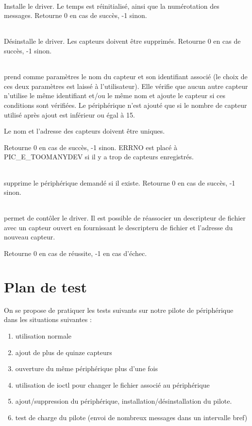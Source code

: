 \begin{m_desc}

 \item [PIC\_DrvInstall] \hfill\\
Installe le driver.
Le temps est réinitialisé, ainsi que la numérotation des messages.
Retourne 0 en cas de succès, -1 sinon.

 \item [PIC\_DrvRemove] \hfill\\
Désinstalle le driver.
Les capteurs doivent être supprimés.
Retourne 0 en cas de succès, -1 sinon.

 \item [PIC\_DevAdd] \hfill\\
 prend comme paramètres le nom du capteur et son identifiant associé (le choix de 
ces deux paramètres est laissé à l'utilisateur). Elle vérifie que aucun autre 
capteur n'utilise le même identifiant et/ou le même nom et ajoute le capteur
 si ces conditions sont vérifiées.
Le périphérique n'est ajouté que si le nombre de capteur utilisé après ajout
 est inférieur ou égal à 15.

Le nom et l'adresse des capteurs doivent être uniques.

Retourne 0 en cas de succès, -1 sinon.
ERRNO est placé à PIC\_E\_TOOMANYDEV si il y a trop de capteurs enregistrés.

 \item [PIC\_DevDelete] \hfill\\
supprime le périphérique demandé si il existe. 
Retourne 0 en cas de succès, -1 sinon.


\item [PIC\_ioctl]\hfill\\
permet de contôler le driver.
Il est possible de réassocier un descripteur de fichier avec un capteur ouvert
en fournissant le descripteru de fichier et l'adresse du nouveau capteur.

Retourne 0 en cas de réussite, -1 en cas d'échec.
\end{m_desc}


\section{Plan de test}

On se propose de pratiquer les tests suivants sur notre pilote de périphérique dans les situations suivantes :

\begin{enumerate}
 \item utilisation normale
 \item ajout de plus de quinze capteurs
 \item ouverture du même périphérique plus d'une fois
 \item utilisation de ioctl pour changer le fichier associé au périphérique
 \item ajout/suppression du périphérique, installation/désinstallation du pilote.
 \item test de charge du pilote (envoi de nombreux messages dans un intervalle bref)
\end{enumerate}
